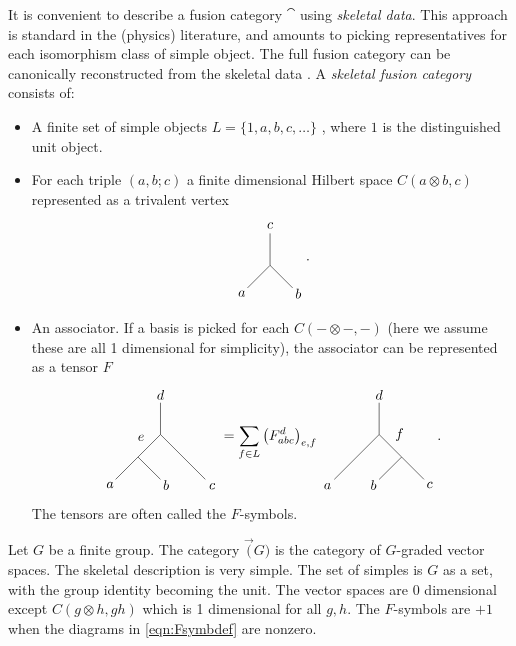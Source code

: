 \begin{definition}
	It is convenient to describe a fusion category $\cat$ using \emph{skeletal data}. This approach is standard in the (physics) literature, and amounts to picking representatives for each isomorphism class of simple object. The full fusion category can be canonically reconstructed from the skeletal data \cite{BBJSkeletal}. A \emph{skeletal fusion category} consists of:
	\begin{itemize}
		\item A finite set of simple objects $L=\{1,a,b,c,\ldots\}$ , where $1$ is the distinguished unit object.
		\item For each triple $(a,b;c)$ a finite dimensional Hilbert space $C(a\otimes b,c)$ represented as a trivalent vertex
		\begin{equation}
		\begin{tikzpicture}[scale=0.8,baseline=(current bounding box.center)]
		\draw (-.707,-.707)--(0,0) node[pos=-.25] {$a$};
		\draw (.707,-.707)--(0,0) node[pos=-.25] {$b$};
		\draw (0,0)--(0,1) node[pos=1.25] {$c$};
		\end{tikzpicture}.
		\end{equation} 
		\item An associator. If a basis is picked for each $C(-\otimes -,-)$ (here we assume these are all 1 dimensional for simplicity), the associator can be represented as a tensor $F$
		\begin{equation}
		\begin{tikzpicture}[scale=0.8,baseline=(current bounding box.center)]
		\draw (0,0)--(0,1) node[pos=1.25] {$d$};
		\draw (0,0)--(1.41,-1.41) node[pos=1.15] {$c$};
		\draw (0,0)--(-.707,-.707) node [pos=.5,above left] {$e$};
		\draw (-.707,-.707)--(-1.41,-1.41)node[pos=1.25] {$a$};
		\draw (-.707,-.707)--(0,-1.41)node[pos=1.25] {$b$};
		\end{tikzpicture}
		=\sum_{f\in L}\left(F_{abc}^{d}\right)_{e,f}
		\begin{tikzpicture}[scale=0.8,baseline=(current bounding box.center)]
		\draw (0,0)--(0,1) node[pos=1.25] {$d$};
		\draw (.707,-.707)--(1.41,-1.41) node[pos=1.25] {$c$};
		\draw (0,0)--(.707,-.707) node [pos=.5,above right] {$f$};
		\draw (0,0)--(-1.41,-1.41)node[pos=1.15] {$a$};
		\draw (.707,-.707)--(0,-1.41)node[pos=1.25] {$b$};
		\end{tikzpicture}.\label{eqn:Fsymbdef}
		\end{equation} 
		The tensors are often called the $F$-symbols.
	\end{itemize}
\end{definition}

\begin{example}[$\Vec(G)$]\label{example:vecG}
	Let $G$ be a finite group. The category $\Vec(G)$ is the category of $G$-graded vector spaces. The skeletal description is very simple. The set of simples is $G$ as a set, with the group identity becoming the unit. The vector spaces are 0 dimensional except $C(g\otimes h, gh)$ which is 1 dimensional for all $g,h$. The $F$-symbols are $+1$ when the diagrams in \eqref{eqn:Fsymbdef} are nonzero.
\end{example}